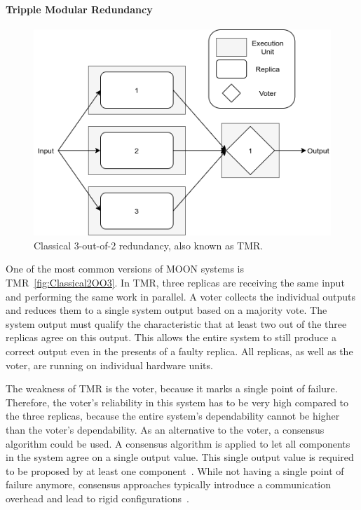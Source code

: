 \paragraph{Tripple Modular Redundancy}
\begin{figure}[!hb]
	\centering
	\includegraphics[width=0.75\linewidth]{images/Classical2OO3}
	\caption{Classical 3-out-of-2 redundancy, also known as \Gls*{TMR}.}
	\label{fig:Classical2OO3}
\end{figure}

One of the most common versions of \gls*{MOON} systems is \gls*{TMR}~\autoref{fig:Classical2OO3}.
In \gls*{TMR}, three replicas are receiving the same input and performing the same work in parallel.
A voter collects the individual outputs and reduces them to a single system output based on a majority vote.
The system output must qualify the characteristic that at least two out of the three replicas agree on this output.
This allows the entire system to still produce a correct output even in the presents of a faulty replica.
All replicas, as well as the voter, are running on individual hardware units.

The weakness of \gls*{TMR} is the voter, because it marks a single point of failure.
Therefore, the voter's reliability in this system has to be very high compared to the three replicas, because the entire system's dependability cannot be higher than the voter's dependability.
As an alternative to the voter, a consensus algorithm could be used.
A consensus algorithm is applied to let all components in the system agree on a single output value.
This single output value is required to be proposed by at least one component~\cite{lamport2001paxos}.
While not having a single point of failure anymore, consensus approaches typically introduce a communication overhead and lead to rigid configurations~\cite{GamerIncreasingMOON}.

